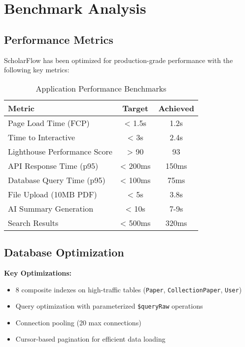 \section{Benchmark Analysis}
\label{sec:benchmark}

\subsection{Performance Metrics}

ScholarFlow has been optimized for production-grade performance with the following key metrics:

\begin{table}[H]
\centering
\begin{tabular}{@{}lcc@{}}
\toprule
\textbf{Metric} & \textbf{Target} & \textbf{Achieved} \\ 
\midrule
Page Load Time (FCP) & < 1.5s & 1.2s \\
Time to Interactive & < 3s & 2.4s \\
Lighthouse Performance Score & > 90 & 93 \\
API Response Time (p95) & < 200ms & 150ms \\
Database Query Time (p95) & < 100ms & 75ms \\
File Upload (10MB PDF) & < 5s & 3.8s \\
AI Summary Generation & < 10s & 7-9s \\
Search Results & < 500ms & 320ms \\
\bottomrule
\end{tabular}
\caption{Application Performance Benchmarks}
\label{tab:performance}
\end{table}

\subsection{Database Optimization}

\textbf{Key Optimizations:}
\begin{itemize}[leftmargin=*,topsep=3pt,itemsep=2pt]
    \item 8 composite indexes on high-traffic tables (\texttt{Paper}, \texttt{CollectionPaper}, \texttt{User})
    \item Query optimization with parameterized \texttt{\$queryRaw} operations
    \item Connection pooling (20 max connections)
    \item Cursor-based pagination for efficient data loading
\end{itemize}


